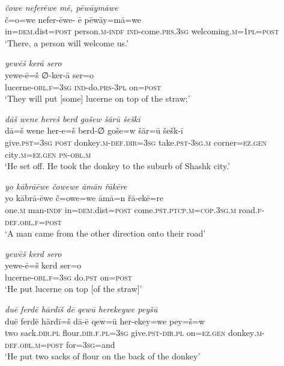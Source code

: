 \ea \label{HB.34}
\textit{čowe neferēwe mē, pēwāymāwe} \\ 
\gll č=o=we nefer-ēwe- ē pēwāy=mā=we \\ 
 in\textsc{=dem}.dist\textsc{=\textsc{post}} person\textsc{.m}\textsc{-indf} \textsc{ind-}come\textsc{.prs}\textsc{.3sg} welcoming\textsc{.m}\textsc{=1pl}\textsc{=\textsc{post}} \\ 
\glt `There, a person will welcome us.'
\z 
 
\ea \label{HB.37}
\textit{yewēš kerā sero} \\ 
\gll yewe-ē=š ∅-ker-ā ser=o \\ 
 lucerne\textsc{-obl}\textsc{\textsc{.f}}\textsc{=3sg} \textsc{ind-}do\textsc{.prs}\textsc{-3pl} on\textsc{=\textsc{post}} \\ 
\glt `They will put [some] lucerne on top of the straw;'
\z 
 
\ea \label{HB.48}
\textit{dāš wene hereš berd gošew šārū šeškī} \\ 
\gll dā=š wene her-e=š berd-∅ goše=w šār=ū šešk-ī \\ 
 give\textsc{.pst}\textsc{=3sg} \textsc{post} donkey\textsc{.m}\textsc{-def}\textsc{.dir}\textsc{=3sg} take\textsc{.pst}\textsc{-3sg}\textsc{.m} corner\textsc{=ez}\textsc{.gen} city\textsc{.m}\textsc{=ez}\textsc{.gen} \textsc{pn}\textsc{-obl}\textsc{.m} \\ 
\glt `He set off. He took the donkey to the suburb of Shashk city.'
\z 
 
\ea \label{HB.49}
\textit{yo kābrāēwe čowewe āmān řākēre} \\ 
\gll yo kābrā-ēwe č=owe=we āmā=n řā-ekē=re \\ 
 one\textsc{.m} man\textsc{-indf} in\textsc{=dem}.dist\textsc{=\textsc{post}} come\textsc{.pst}\textsc{.ptcp}\textsc{.m}\textsc{=cop}\textsc{.3sg}\textsc{.m} road\textsc{\textsc{.f}}\textsc{-def}\textsc{.obl}\textsc{\textsc{.f}}\textsc{=\textsc{post}} \\ 
\glt `A man came from the other direction onto their road'
\z 
 
\ea \label{HB.55}
\textit{yewēš kerd sero} \\ 
\gll yewe-ē=š kerd ser=o \\ 
 lucerne\textsc{-obl}\textsc{\textsc{.f}}\textsc{=3sg} do\textsc{.pst} on\textsc{=\textsc{post}} \\ 
\glt `He put lucerne on top [of the straw]'
\z 
 
\ea \label{HB.61}
\textit{duē ferdē hārdīš dē qewū herekeywe peyšū} \\ 
\gll duē ferdē hārdī=š dā-ē qew=ū her-ekey=we pey=š=w \\ 
 two sack\textsc{.dir}\textsc{.pl} flour\textsc{.dir}\textsc{\textsc{.f}}\textsc{.pl}\textsc{=3sg} give\textsc{.pst}\textsc{-dir}\textsc{.pl} on\textsc{=ez}\textsc{.gen} donkey\textsc{.m}\textsc{-def}\textsc{.obl}\textsc{.m}\textsc{=\textsc{post}} for\textsc{=3sg}=and \\ 
\glt `He put two sacks of flour on the back of the donkey'
\z 
 
